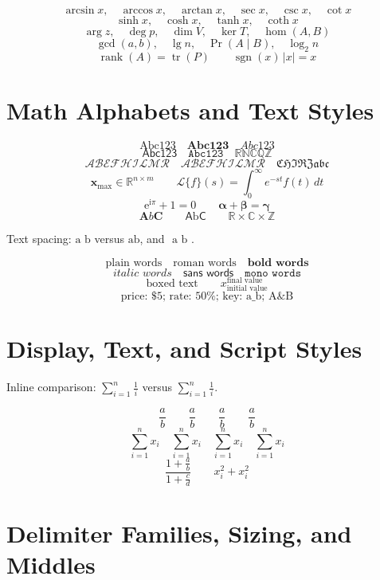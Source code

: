 \documentclass[12pt]{article}
\begin{document}
\[
\arcsin x,\quad \arccos x,\quad \arctan x,
\quad \sec x,\quad \csc x,\quad \cot x
\]
\[
\sinh x,\quad \cosh x,\quad \tanh x,\quad \coth x
\]
\[
\arg z,\quad \deg p,\quad \dim V,\quad \ker T,\quad \hom(A,B)
\]
\[
\gcd(a,b),\quad \lg n,\quad \Pr(A\mid B),\quad \log_2 n
\]
\[
\operatorname{rank}(A)=\operatorname{tr}(P)
\qquad \operatorname{sgn}(x)\,|x|=x
\]

\section{Math Alphabets and Text Styles}

\[
\mathrm{Abc123} \quad \mathbf{Abc123} \quad \mathit{Abc123}
\]
\[
\mathsf{Abc123} \quad \mathtt{Abc123} \quad \mathbb{RNCQZ}
\]
\[
\mathcal{ABEFHILMR} \quad \mathscr{ABEFHILMR} \quad \mathfrak{CHIRZabc}
\]
\[
\mathbf{x}_{\mathrm{max}} \in \mathbb{R}^{n\times m}
\qquad \mathcal{L}\{f\}(s)=\int_0^\infty e^{-st}f(t)\,dt
\]
\[
\mathrm{e}^{\mathrm{i}\pi}+1=0
\qquad \mathbf{\alpha}+\boldsymbol{\beta}=\boldsymbol{\gamma}
\]
\[
\mathbf{A\mathit{b}C} \qquad \mathsf{A\mathrm{b}C}
\qquad \mathbb{R}\times\mathbb{C}\times\mathbb{Z}
\]

Text spacing: $\text{a b}$ versus $\text{ab}$, and $\text{  a  b  }$.

\[
\text{plain words} \quad \textrm{roman words} \quad \textbf{bold words}
\]
\[
\textit{italic words} \quad \textsf{sans words} \quad \texttt{mono words}
\]
\[
\mbox{boxed text} \qquad x_{\text{initial value}}^{\text{final value}}
\]
\[
\text{price: \$5; rate: 50\%; key: a\_b; A\&B}
\]

\section{Display, Text, and Script Styles}

Inline comparison: $\sum_{i=1}^{n}\frac{1}{i}$ versus
$\displaystyle\sum_{i=1}^{n}\frac{1}{i}$.

\[
{\displaystyle\frac{a}{b}} \qquad {\textstyle\frac{a}{b}}
\qquad {\scriptstyle\frac{a}{b}} \qquad {\scriptscriptstyle\frac{a}{b}}
\]
\[
{\displaystyle\sum_{i=1}^{n}x_i} \quad {\textstyle\sum_{i=1}^{n}x_i}
\quad {\scriptstyle\sum_{i=1}^{n}x_i} \quad {\scriptscriptstyle\sum_{i=1}^{n}x_i}
\]
\[
\frac{1+{\displaystyle\frac{a}{b}}}{1+{\textstyle\frac{c}{d}}}
\qquad {\scriptstyle x_i^2}+x_i^2
\]

\section{Delimiter Families, Sizing, and Middles}
\end{document}

